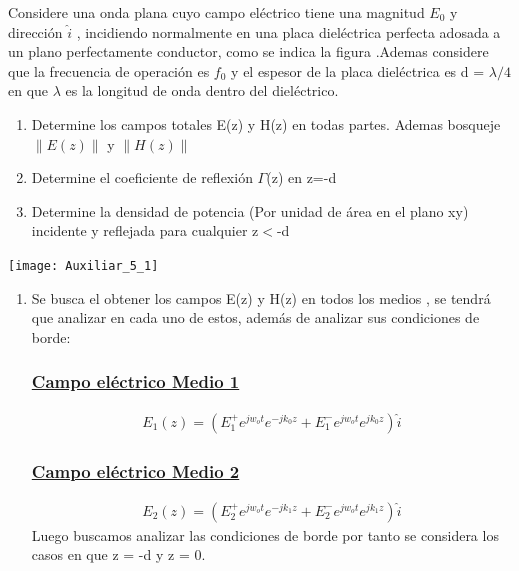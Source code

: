 \documentclass[
  11pt,
  letterpaper,
   addpoints,
   answers
  ]{exam}
\begin{document}
\begin{questions}
    \question  Considere una onda plana cuyo campo eléctrico tiene una magnitud $E_{0}$ y dirección $\hat{i}$ , incidiendo normalmente en una placa dieléctrica perfecta adosada a un plano perfectamente conductor, como se indica la figura .Ademas considere que la frecuencia de operación es $f_{0}$ y el espesor de la placa dieléctrica es d = $\lambda/4$ en que $\lambda$ es la longitud de onda dentro del dieléctrico.
    \begin{enumerate}
        \item Determine los campos totales E(z) y H(z) en todas partes. Ademas bosqueje $\|E(z)\|$ y $\|H(z)\|$ 
        \item Determine el coeficiente de reflexión $\Gamma$(z) en z=-d
        \item  Determine la densidad de potencia (Por unidad de área en el plano xy) incidente y reflejada para cualquier z$<$-d
    \end{enumerate}
    
    \begin{center}
        \texttt{[image: Auxiliar\_5\_1]}
      \end{center}
    \begin{solution}
         \begin{enumerate}
            \item Se busca el obtener los campos E(z) y H(z) en todos los medios , se tendrá que analizar en cada uno de estos, además de analizar sus condiciones de borde:
            \subsubsection*{\underline{Campo eléctrico Medio 1}}
            \begin{align}
                E_{1}(z) = ( E_{1}^{+}e^{jw_{o}t}e^{-jk_{0}z} +E_{1}^{-}e^{jw_{o}t}e^{jk_{0}z})\hat{i}
            \end{align}
            \subsubsection*{\underline{Campo eléctrico Medio 2}}
            \begin{align}
                E_{2}(z) = ( E_{2}^{+}e^{jw_{o}t}e^{-jk_{1}z} +E_{2}^{-}e^{jw_{o}t}e^{jk_{1}z})\hat{i}
            \end{align}
            Luego buscamos analizar las condiciones de borde por tanto se considera los casos en que z = -d y z = 0.

\end{enumerate}
\end{solution}
\end{questions}
\end{document}
